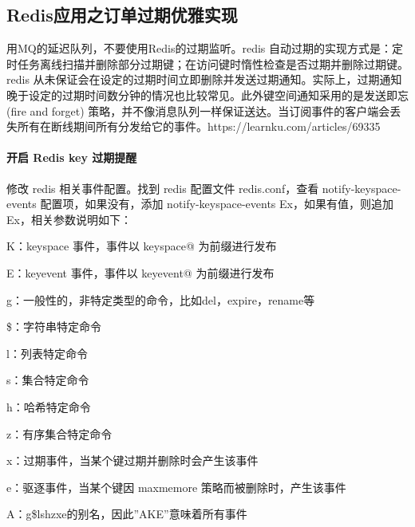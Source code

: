 \documentclass[../../../interview-questions.tex]{subfiles}
\begin{document}
\subsection{Redis应用之订单过期优雅实现}

用MQ的延迟队列，不要使用Redis的过期监听。redis 自动过期的实现方式是：定时任务离线扫描并删除部分过期键；在访问键时惰性检查是否过期并删除过期键。redis 从未保证会在设定的过期时间立即删除并发送过期通知。实际上，过期通知晚于设定的过期时间数分钟的情况也比较常见。此外键空间通知采用的是发送即忘 (fire and forget) 策略，并不像消息队列一样保证送达。当订阅事件的客户端会丢失所有在断线期间所有分发给它的事件。https://learnku.com/articles/69335

\paragraph{开启 Redis key 过期提醒}


修改 redis 相关事件配置。找到 redis 配置文件 redis.conf，查看 notify-keyspace-events 配置项，如果没有，添加 notify-keyspace-events Ex，如果有值，则追加 Ex，相关参数说明如下：

K：keyspace 事件，事件以 keyspace@ 为前缀进行发布

E：keyevent 事件，事件以 keyevent@ 为前缀进行发布

g：一般性的，非特定类型的命令，比如del，expire，rename等

\$：字符串特定命令

l：列表特定命令

s：集合特定命令

h：哈希特定命令

z：有序集合特定命令

x：过期事件，当某个键过期并删除时会产生该事件

e：驱逐事件，当某个键因 maxmemore 策略而被删除时，产生该事件

A：g\$lshzxe的别名，因此”AKE”意味着所有事件
\end{document}
